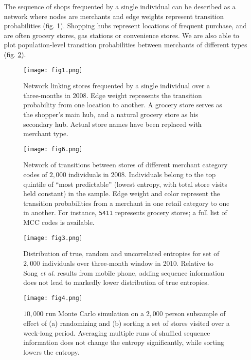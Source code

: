 \documentclass[twocolumn,floatfix]{revtex4}
\begin{document}
The sequence of shops frequented by a single individual can be described as a network where nodes are merchants and edge weights represent transition probabilities (fig. \ref{networkshops}). Shopping hubs represent locations of frequent purchase,  and are often grocery stores, gas stations or convenience stores. We are also able to plot population-level transition probabilities between merchants of different types (fig. \ref{transitions}).

\begin{figure}[ht]
\centering
\texttt{[image: fig1.png]}
\caption{Network linking stores frequented by a single individual over a three-months in 2008. Edge weight represents the transition probability from one location to another. A grocery store serves as the shopper’s main hub, and a natural grocery store as his secondary hub. Actual store names have been replaced with merchant type.}
\label{networkshops}
\end{figure}

\begin{figure}[ht]
\centering
\texttt{[image: fig6.png]}
\caption{Network of transitions between stores of different merchant category codes of $2,000$ individuals in 2008. Individuals belong to the top quintile of ``most predictable'' (lowest entropy, with total store visits held constant) in the sample. Edge weight and color represent the transition probabilities from a merchant in one retail category to one in another. For instance, {\tt 5411} represents grocery stores; a full list of MCC codes is available.}
\label{transitions}
\end{figure}



\begin{figure}[ht]
\centering
\texttt{[image: fig3.png]}
\caption{Distribution of true, random and uncorrelated entropies for set of $2,000$ individuals over three-month window in 2010.  Relative to Song {\it et al.} results from mobile phone, adding sequence information does not lead to markedly lower distribution of true entropies.}
\label{distentropies}
\end{figure}

\begin{figure}[ht]
\centering
\texttt{[image: fig4.png]}
\caption{$10,000$ run Monte Carlo simulation on a $2,000$ person subsample of effect of (a) randomizing and (b) sorting a set of stores visited over a week-long period. Averaging multiple runs of shuffled sequence information does not change the entropy significantly, while sorting lowers the entropy.}
\label{simulation}
\end{figure}
\end{document}
